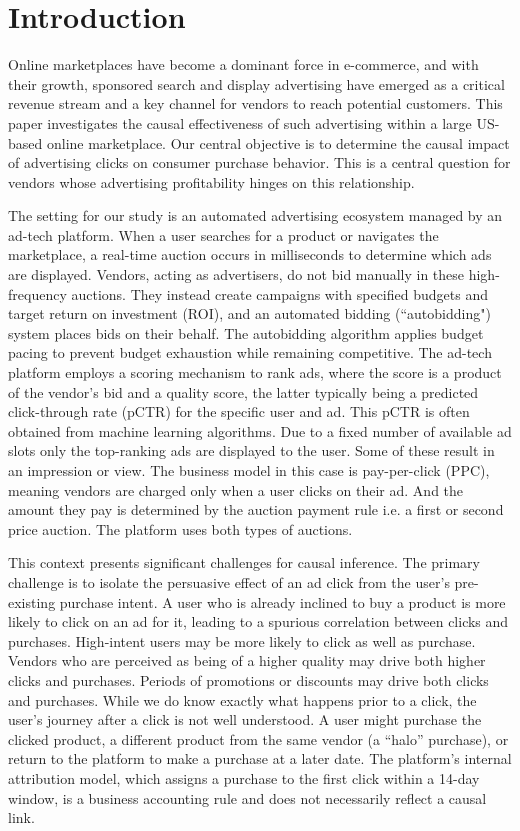 \section*{Introduction}

Online marketplaces have become a dominant force in e-commerce, and with their growth, sponsored search and display advertising have emerged as a critical revenue stream and a key channel for vendors to reach potential customers. This paper investigates the causal effectiveness of such advertising within a large US-based online marketplace. Our central objective is to determine the causal impact of advertising clicks on consumer purchase behavior. This is a central question for vendors whose advertising profitability hinges on this relationship.

The setting for our study is an automated advertising ecosystem managed by an ad-tech platform. When a user searches for a product or navigates the marketplace, a real-time auction occurs in milliseconds to determine which ads are displayed. Vendors, acting as advertisers, do not bid manually in these high-frequency auctions. They instead create campaigns with specified budgets and target return on investment (ROI), and an automated bidding (``autobidding") system places bids on their behalf. The autobidding algorithm applies budget pacing to prevent budget exhaustion while remaining competitive. The ad-tech platform employs a scoring mechanism to rank ads, where the score is a product of the vendor's bid and a quality score, the latter typically being a predicted click-through rate (pCTR) for the specific user and ad. This pCTR is often obtained from machine learning algorithms.  Due to a fixed number of available ad slots only the top-ranking ads are displayed to the user. Some of these result in an impression or view. The business model in this case is pay-per-click (PPC), meaning vendors are charged only when a user clicks on their ad. And the amount they pay is determined by the auction payment rule i.e. a first or second price auction. The platform uses both types of auctions. 

This context presents significant challenges for causal inference. The primary challenge is to isolate the persuasive effect of an ad click from the user's pre-existing purchase intent. A user who is already inclined to buy a product is more likely to click on an ad for it, leading to a spurious correlation between clicks and purchases. High-intent users may be more likely to click as well as purchase. Vendors who are perceived as being of a higher quality may drive both higher clicks and purchases. Periods of promotions or discounts may drive both clicks and purchases. While we do know exactly what happens prior to a click, the user's journey after a click is not well understood. A user might purchase the clicked product, a different product from the same vendor (a “halo” purchase), or return to the platform to make a purchase at a later date. The platform's internal attribution model, which assigns a purchase to the first click within a 14-day window, is a business accounting rule and does not necessarily reflect a causal link.

